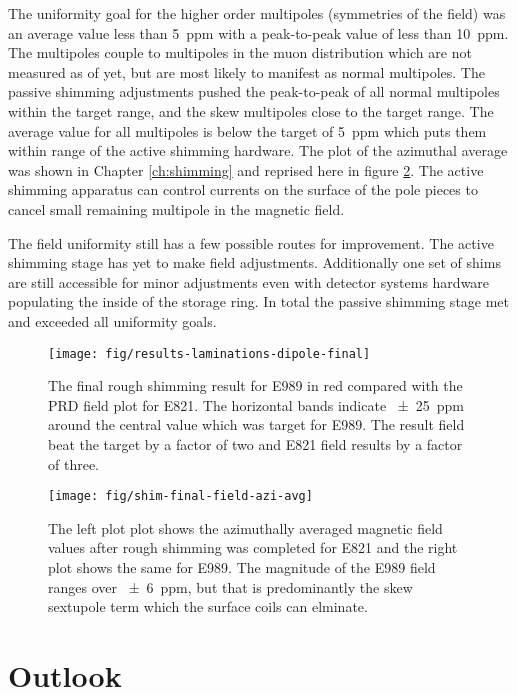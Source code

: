 The uniformity goal for the higher order multipoles (symmetries of the field) was an average value less than \SI{5}{ppm} with a peak-to-peak value of less than \SI{10}{ppm}.  The multipoles couple to multipoles in the muon distribution which are not measured as of yet, but are most likely to manifest as normal multipoles.  The passive shimming adjustments pushed the peak-to-peak of all normal multipoles within the target range, and the skew multipoles close to the target range.  The average value for all multipoles is below the target of \SI{5}{ppm} which puts them within range of the active shimming hardware.  The plot of the azimuthal average was shown in Chapter \ref{ch:shimming} and reprised here in figure \ref{fig:conclusion-azi-avg}.  The active shimming apparatus can control currents on the surface of the pole pieces to cancel small remaining multipole in the magnetic field.

The field uniformity still has a few possible routes for improvement.  The active shimming stage has yet to make field adjustments.  Additionally one set of shims are still accessible for minor adjustments even with \mugmtwo detector systems hardware populating the inside of the storage ring. In total the passive shimming stage met and exceeded all uniformity goals.

\begin{figure}
\centering
\texttt{[image: fig/results-laminations-dipole-final]}
\caption{The final rough shimming result for E989 in red compared with the PRD field plot for E821.  The horizontal bands indicate \SI{\pm 25}{ppm} around the central value which was target for E989.  The result field beat the target by a factor of two and E821 field results by a factor of three. \label{fig:conclusions-dipole-final}}
\end{figure}

\begin{figure}
\centering
\texttt{[image: fig/shim-final-field-azi-avg]}
\caption{
    The left plot plot shows the azimuthally averaged magnetic field values after rough shimming was completed for E821 and the right plot shows the same for E989.  The magnitude of the E989 field ranges over \SI{\pm 6}{ppm}, but that is predominantly the skew sextupole term which the surface coils can elminate.
    \label{fig:conclusion-azi-avg}
}
\end{figure}

\section{Outlook}

